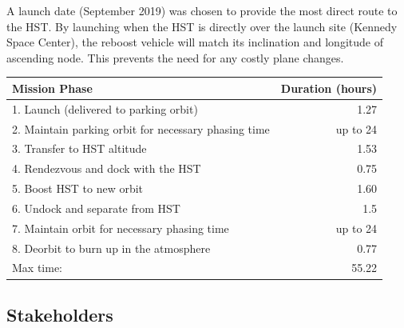 \documentclass[paper=letter, fontsize=11pt]{scrartcl} %
\numberwithin{equation}{section} %
\numberwithin{figure}{section} %
\numberwithin{table}{section} %
\begin{document}
A launch date (September 2019) was chosen to provide the most direct route to the HST. By launching when the HST is directly over the launch site (Kennedy Space Center), the reboost vehicle will match its inclination and longitude of ascending node. This prevents the need for any costly plane changes.


\begin{table}[H]
\begin{center}
\begin{tabular}{l r}
\toprule
Mission Phase & Duration (hours) \\
\midrule
1. Launch (delivered to parking orbit) & 1.27 \\
2. Maintain parking orbit for necessary phasing time & up to 24 \\
3. Transfer to HST altitude & 1.53 \\
4. Rendezvous and dock with the HST & 0.75 \\
5. Boost HST to new orbit & 1.60 \\
6. Undock and separate from HST & 1.5 \\
7. Maintain orbit for necessary phasing time & up to 24 \\
8. Deorbit to burn up in the atmosphere & 0.77 \\
\bottomrule
Max time: & 55.22 \\
\bottomrule
\end{tabular}
\end{center}
\end{table}

\subsection{Stakeholders}
\end{document}
